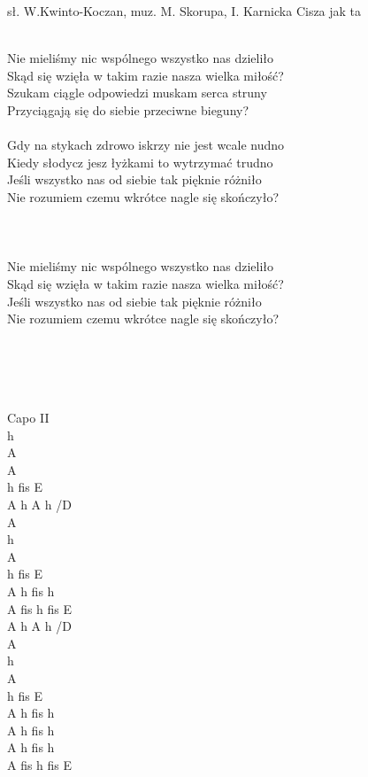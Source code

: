 {sł. W.Kwinto-Koczan, muz. M. Skorupa, I. Karnicka}
{Cisza jak ta}
\begin{text}
\vin \\
Nie mieliśmy nic wspólnego wszystko nas dzieliło\\
Skąd się wzięła w takim razie nasza wielka miłość?\\
Szukam ciągle odpowiedzi muskam serca struny\\
Przyciągają się do siebie przeciwne bieguny?\\
\vin \\

Gdy na stykach zdrowo iskrzy nie jest wcale nudno\\
Kiedy słodycz jesz łyżkami to wytrzymać trudno\\
Jeśli wszystko nas od siebie tak pięknie różniło\\
Nie rozumiem czemu wkrótce nagle się skończyło?\\
\vin \\
\vin \\
\vin \\

Nie mieliśmy nic wspólnego wszystko nas dzieliło\\
Skąd się wzięła w takim razie nasza wielka miłość?\\
Jeśli wszystko nas od siebie tak pięknie różniło\\
Nie rozumiem czemu wkrótce nagle się skończyło?\\
\vin \\
\vin \\
\vin \\
\vin \\
\end{text}
\begin{chord}
\vin Capo II\\
h\\
A\\
A\\
h fis E\\
\vin A h A h /D\\

A\\
h\\
A\\
h fis E\\
\vin A h fis h\\
\vin A fis h fis E\\
\vin A h A h /D\\

A\\
h\\
A\\
h fis E\\
\vin A h fis h\\
\vin A h fis h\\
\vin A h fis h\\
\vin A fis h fis E\\
\end{chord}
